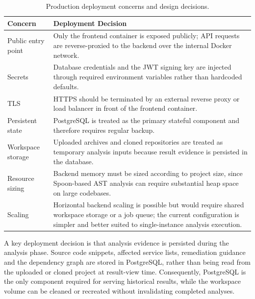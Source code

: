 \begin{table}[htbp]
    \centering
    \footnotesize
    \begin{tabular}{|l|p{9cm}|}
        \hline
        \textbf{Concern} & \textbf{Deployment Decision} \\
        \hline\hline
        Public entry point & Only the frontend container is exposed publicly; API requests are reverse-proxied to the backend over the internal Docker network. \\
        \hline
        Secrets & Database credentials and the JWT signing key are injected through required environment variables rather than hardcoded defaults. \\
        \hline
        TLS & HTTPS should be terminated by an external reverse proxy or load balancer in front of the frontend container. \\
        \hline
        Persistent state & PostgreSQL is treated as the primary stateful component and therefore requires regular backup. \\
        \hline
        Workspace storage & Uploaded archives and cloned repositories are treated as temporary analysis inputs because result evidence is persisted in the database. \\
        \hline
        Resource sizing & Backend memory must be sized according to project size, since Spoon-based AST analysis can require substantial heap space on large codebases. \\
        \hline
        Scaling & Horizontal backend scaling is possible but would require shared workspace storage or a job queue; the current configuration is simpler and better suited to single-instance analysis execution. \\
        \hline
    \end{tabular}
    \caption{Production deployment concerns and design decisions.}
    \label{tab:prod-deployment-considerations}
\end{table}

\par A key deployment decision is that analysis evidence is persisted during the analysis phase. Source code snippets, affected service lists, remediation guidance and the dependency graph are stored in PostgreSQL, rather than being read from the uploaded or cloned project at result-view time. Consequently, PostgreSQL is the only component required for serving historical results, while the workspace volume can be cleaned or recreated without invalidating completed analyses.


